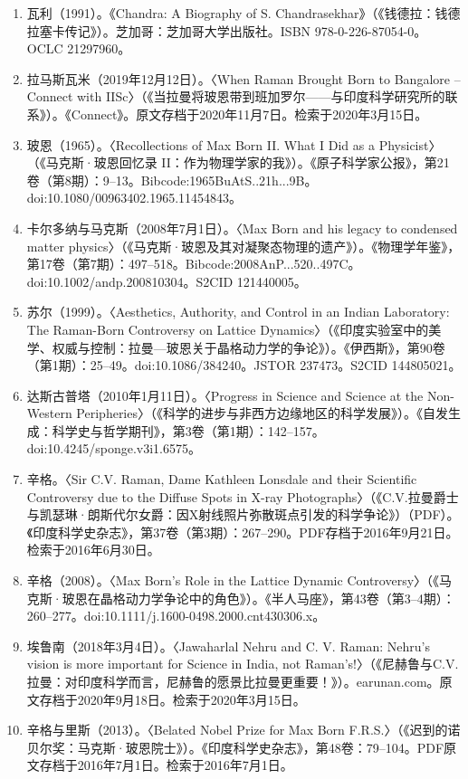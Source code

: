 \begin{enumerate}
\item 瓦利（1991）。《Chandra: A Biography of S. Chandrasekhar》（《钱德拉：钱德拉塞卡传记》）。芝加哥：芝加哥大学出版社。ISBN 978-0-226-87054-0。OCLC 21297960。
\item 拉马斯瓦米（2019年12月12日）。〈When Raman Brought Born to Bangalore – Connect with IISc〉（《当拉曼将玻恩带到班加罗尔——与印度科学研究所的联系》）。《Connect》。原文存档于2020年11月7日。检索于2020年3月15日。
\item 玻恩（1965）。〈Recollections of Max Born II. What I Did as a Physicist〉（《马克斯·玻恩回忆录 II：作为物理学家的我》）。《原子科学家公报》，第21卷（第8期）：9–13。Bibcode:1965BuAtS..21h...9B。doi:10.1080/00963402.1965.11454843。
\item 卡尔多纳与马克斯（2008年7月1日）。〈Max Born and his legacy to condensed matter physics〉（《马克斯·玻恩及其对凝聚态物理的遗产》）。《物理学年鉴》，第17卷（第7期）：497–518。Bibcode:2008AnP...520..497C。doi:10.1002/andp.200810304。S2CID 121440005。
\item 苏尔（1999）。〈Aesthetics, Authority, and Control in an Indian Laboratory: The Raman-Born Controversy on Lattice Dynamics〉（《印度实验室中的美学、权威与控制：拉曼—玻恩关于晶格动力学的争论》）。《伊西斯》，第90卷（第1期）：25–49。doi:10.1086/384240。JSTOR 237473。S2CID 144805021。
\item 达斯古普塔（2010年1月11日）。〈Progress in Science and Science at the Non-Western Peripheries〉（《科学的进步与非西方边缘地区的科学发展》）。《自发生成：科学史与哲学期刊》，第3卷（第1期）：142–157。doi:10.4245/sponge.v3i1.6575。
\item 辛格。〈Sir C.V. Raman, Dame Kathleen Lonsdale and their Scientific Controversy due to the Diffuse Spots in X-ray Photographs〉（《C.V.拉曼爵士与凯瑟琳·朗斯代尔女爵：因X射线照片弥散斑点引发的科学争论》）（PDF）。《印度科学史杂志》，第37卷（第3期）：267–290。PDF存档于2016年9月21日。检索于2016年6月30日。
\item 辛格（2008）。〈Max Born's Role in the Lattice Dynamic Controversy〉（《马克斯·玻恩在晶格动力学争论中的角色》）。《半人马座》，第43卷（第3–4期）：260–277。doi:10.1111/j.1600-0498.2000.cnt430306.x。
\item 埃鲁南（2018年3月4日）。〈Jawaharlal Nehru and C. V. Raman: Nehru's vision is more important for Science in India, not Raman's!〉（《尼赫鲁与C.V.拉曼：对印度科学而言，尼赫鲁的愿景比拉曼更重要！》）。earunan.com。原文存档于2020年9月18日。检索于2020年3月15日。
\item 辛格与里斯（2013）。〈Belated Nobel Prize for Max Born F.R.S.〉（《迟到的诺贝尔奖：马克斯·玻恩院士》）。《印度科学史杂志》，第48卷：79–104。PDF原文存档于2016年7月1日。检索于2016年7月1日。

\end{enumerate}

